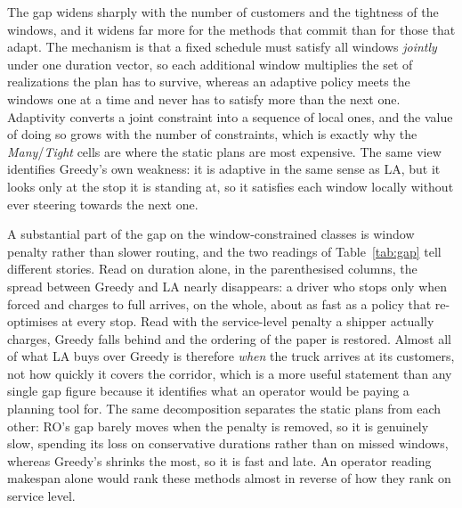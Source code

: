 The gap widens sharply with the number of customers and the tightness of the windows, and it widens far more for the methods that commit than for those that adapt. The mechanism is that a fixed schedule must satisfy all windows \emph{jointly} under one duration vector, so each additional window multiplies the set of realizations the plan has to survive, whereas an adaptive policy meets the windows one at a time and never has to satisfy more than the next one. Adaptivity converts a joint constraint into a sequence of local ones, and the value of doing so grows with the number of constraints, which is exactly why the \emph{Many}/\emph{Tight} cells are where the static plans are most expensive. The same view identifies Greedy's own weakness: it is adaptive in the same sense as LA, but it looks only at the stop it is standing at, so it satisfies each window locally without ever steering towards the next one.

A substantial part of the gap on the window-constrained classes is window penalty rather than slower routing, and the two readings of Table~\ref{tab:gap} tell different stories. Read on duration alone, in the parenthesised columns, the spread between Greedy and LA nearly disappears: a driver who stops only when forced and charges to full arrives, on the whole, about as fast as a policy that re-optimises at every stop. Read with the service-level penalty a shipper actually charges, Greedy falls behind and the ordering of the paper is restored. Almost all of what LA buys over Greedy is therefore \emph{when} the truck arrives at its customers, not how quickly it covers the corridor, which is a more useful statement than any single gap figure because it identifies what an operator would be paying a planning tool for. The same decomposition separates the static plans from each other: RO's gap barely moves when the penalty is removed, so it is genuinely slow, spending its loss on conservative durations rather than on missed windows, whereas Greedy's shrinks the most, so it is fast and late. An operator reading makespan alone would rank these methods almost in reverse of how they rank on service level.

